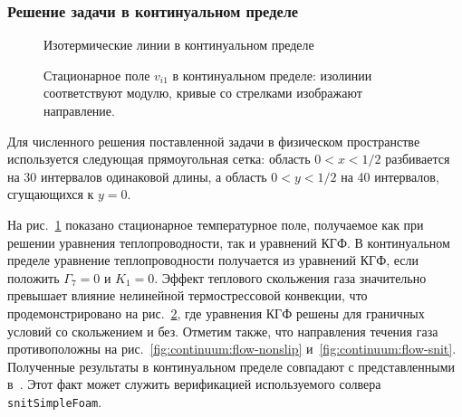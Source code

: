 \subsubsection{Решение задачи в континуальном пределе}

\begin{figure}
    \centering
    \caption{Изотермические линии в континуальном пределе}
    \label{fig:continuum:temp}
\end{figure}

\begin{figure}
    \centering
    \caption{Стационарное поле \(v_{i1}\) в континуальном пределе:
        изолинии соответствуют модулю, кривые со стрелками изображают направление.}
    \label{fig:continuum:flow}
\end{figure}

Для численного решения поставленной задачи в физическом пространстве
используется следующая прямоугольная сетка:
область \(0<x<1/2\) разбивается на 30 интервалов одинаковой длины,
а область \(0<y<1/2\) на 40 интервалов, сгущающихся к \(y=0\).

На рис.~\ref{fig:continuum:temp} показано стационарное температурное поле,
получаемое как при решении уравнения теплопроводности, так и уравнений КГФ.
В континуальном пределе уравнение теплопроводности получается из уравнений КГФ,
если положить \(\Gamma_7=0\) и \(K_1=0\).
Эффект теплового скольжения газа значительно превышает влияние нелинейной термострессовой конвекции,
что продемонстрировано на рис.~\ref{fig:continuum:flow}, где уравнения КГФ решены
для граничных условий со скольжением и без.
Отметим также, что направления течения газа противоположны на рис.~\ref{fig:continuum:flow-nonslip}
и~\ref{fig:continuum:flow-snit}.
Полученные результаты в континуальном пределе совпадают с представленными в~\cite{Sone1996}.
Этот факт может служить верификацией используемого солвера \verb+snitSimpleFoam+.

